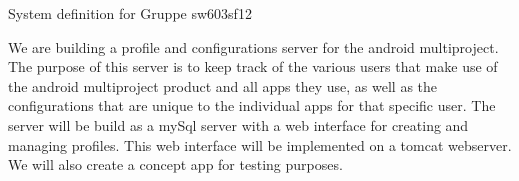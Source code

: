 System definition for Gruppe sw603sf12

We are building a profile and configurations server for the android multiproject.
The purpose of this server is to keep track of the various users that make use of the android multiproject
product and all apps they use, as well as the configurations that are unique to the individual apps for that
specific user. The server will be build as a mySql server with a web interface for creating and managing profiles.
This web interface will be implemented on a tomcat webserver. We will also create a concept app for testing purposes.